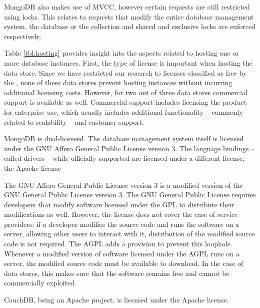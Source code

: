 MongoDB also makes use of MVCC, however certain requests are still restricted using locks.
This relates to requests that modify the entire database management system, the database or the collection and shared and exclusive locks are enforced respectively.

\begin{landscape}
  
\end{landscape}

Table \ref{tbl:hosting} provides insight into the aspects related to hosting one or more database instances.
First, the type of license is important when hosting the data store.
Since we have restricted our research to licenses classified as free by the \textcite{FreeSoftwareFoundation1985}, none of these data stores prevent hosting instances without incurring additional licensing costs.
However, for two out of three data stores commercial support is available as well.
Commercial support includes licensing the product for enterprise use, which usually includes additional functionality -- commonly related to scalability -- and customer support.

MongoDB is dual-licensed.
The database management system itself is licensed under the GNU Affero General Public License version 3.
The language bindings -- called drivers -- while officially supported are licensed under a different license, the Apache license

The GNU Affero General Public License version 3 is a modified version of the GNU General Public License version 3.
The GNU General Public License requires developers that modify software licensed under the GPL to distribute their modifications as well.
However, the license does not cover the case of service providers: if a developer modifies the source code and runs the software on a server, allowing other users to interact with it, distribution of the modified source code is not required.
The AGPL adds a provision to prevent this loophole.
Whenever a modified version of software licensed under the AGPL runs on a server, the modified source code must be available to download.
In the case of data stores, this makes sure that the software remains free and cannot be commercially exploited.

CouchDB, being an Apache project, is licensed under the Apache license.

